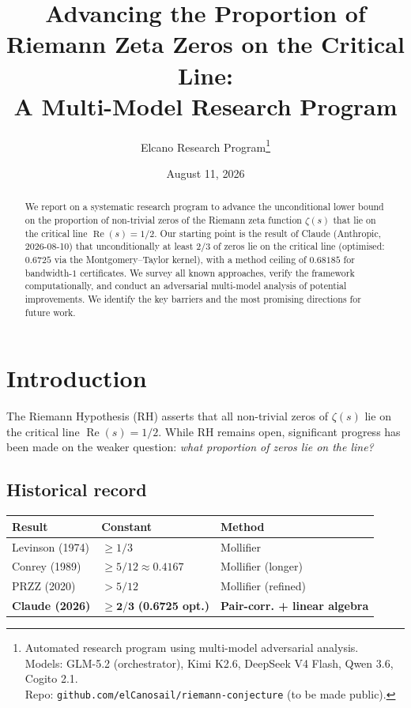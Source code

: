 \documentclass[11pt,a4paper]{article}
\title{Advancing the Proportion of Riemann Zeta Zeros on the Critical Line: \\
A Multi-Model Research Program}
\author{Elcano Research Program\footnote{Automated research program using multi-model adversarial analysis. \\
Models: GLM-5.2 (orchestrator), Kimi K2.6, DeepSeek V4 Flash, Qwen 3.6, Cogito 2.1. \\
Repo: \texttt{github.com/elCanosail/riemann-conjecture} (to be made public).}}
\date{August 11, 2026}
\theoremstyle{definition}
\theoremstyle{remark}
\newcommand{\re}{\operatorname{Re}}
\begin{document}
\maketitle

\begin{abstract}
We report on a systematic research program to advance the unconditional lower bound on the proportion of non-trivial zeros of the Riemann zeta function $\zeta(s)$ that lie on the critical line $\re(s) = 1/2$. Our starting point is the result of Claude (Anthropic, 2026-08-10) that unconditionally at least $2/3$ of zeros lie on the critical line (optimised: $0.6725$ via the Montgomery--Taylor kernel), with a method ceiling of $0.68185$ for bandwidth-$1$ certificates. We survey all known approaches, verify the framework computationally, and conduct an adversarial multi-model analysis of potential improvements. We identify the key barriers and the most promising directions for future work.
\end{abstract}

\tableofcontents

\section{Introduction}

The Riemann Hypothesis (RH) asserts that all non-trivial zeros of $\zeta(s)$ lie on the critical line $\re(s) = 1/2$. While RH remains open, significant progress has been made on the weaker question: \emph{what proportion of zeros lie on the line?}

\subsection{Historical record}

\begin{center}
\begin{tabular}{lll}
\toprule
\textbf{Result} & \textbf{Constant} & \textbf{Method} \\
\midrule
Levinson (1974) & $\geq 1/3$ & Mollifier \\
Conrey (1989) & $\geq 5/12 \approx 0.4167$ & Mollifier (longer) \\
PRZZ (2020) & $> 5/12$ & Mollifier (refined) \\
\textbf{Claude (2026)} & $\geq \mathbf{2/3}$ \textbf{(0.6725 opt.)} & \textbf{Pair-corr. + linear algebra} \\
\bottomrule
\end{tabular}
\end{center}
\end{document}
